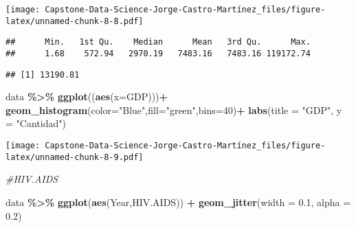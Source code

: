 \documentclass[
]{article}
\newenvironment{Shaded}{\begin{snugshade}}{\end{snugshade}}
\newcommand{\AttributeTok}[1]{\textcolor[rgb]{0.13,0.29,0.53}{#1}}
\newcommand{\CommentTok}[1]{\textcolor[rgb]{0.56,0.35,0.01}{\textit{#1}}}
\newcommand{\DecValTok}[1]{\textcolor[rgb]{0.00,0.00,0.81}{#1}}
\newcommand{\FloatTok}[1]{\textcolor[rgb]{0.00,0.00,0.81}{#1}}
\newcommand{\FunctionTok}[1]{\textcolor[rgb]{0.13,0.29,0.53}{\textbf{#1}}}
\newcommand{\NormalTok}[1]{#1}
\newcommand{\SpecialCharTok}[1]{\textcolor[rgb]{0.81,0.36,0.00}{\textbf{#1}}}
\newcommand{\StringTok}[1]{\textcolor[rgb]{0.31,0.60,0.02}{#1}}
\begin{document}
\texttt{[image: Capstone-Data-Science-Jorge-Castro-Martínez\_files/figure-latex/unnamed-chunk-8-8.pdf]}

\begin{Shaded}
\end{Shaded}

\begin{verbatim}
##      Min.   1st Qu.    Median      Mean   3rd Qu.      Max. 
##      1.68    572.94   2970.19   7483.16   7483.16 119172.74
\end{verbatim}

\begin{Shaded}
\end{Shaded}

\begin{verbatim}
## [1] 13190.81
\end{verbatim}

\begin{Shaded}
\begin{Highlighting}[]
\NormalTok{data }\SpecialCharTok{\%\textgreater{}\%} \FunctionTok{ggplot}\NormalTok{((}\FunctionTok{aes}\NormalTok{(}\AttributeTok{x=}\NormalTok{GDP)))}\SpecialCharTok{+}
  \FunctionTok{geom\_histogram}\NormalTok{(}\AttributeTok{color=}\StringTok{"Blue"}\NormalTok{,}\AttributeTok{fill=}\StringTok{"green"}\NormalTok{,}\AttributeTok{bins=}\DecValTok{40}\NormalTok{)}\SpecialCharTok{+}
  \FunctionTok{labs}\NormalTok{(}\AttributeTok{title =} \StringTok{"GDP"}\NormalTok{, }\AttributeTok{y =} \StringTok{"Cantidad"}\NormalTok{)}
\end{Highlighting}
\end{Shaded}

\texttt{[image: Capstone-Data-Science-Jorge-Castro-Martínez\_files/figure-latex/unnamed-chunk-8-9.pdf]}

\begin{Shaded}
\begin{Highlighting}[]
\CommentTok{\#HIV.AIDS}

\NormalTok{data  }\SpecialCharTok{\%\textgreater{}\%} \FunctionTok{ggplot}\NormalTok{(}\FunctionTok{aes}\NormalTok{(Year,HIV.AIDS)) }\SpecialCharTok{+} \FunctionTok{geom\_jitter}\NormalTok{(}\AttributeTok{width =} \FloatTok{0.1}\NormalTok{, }\AttributeTok{alpha =} \FloatTok{0.2}\NormalTok{)}
\end{Highlighting}
\end{Shaded}
\end{document}
